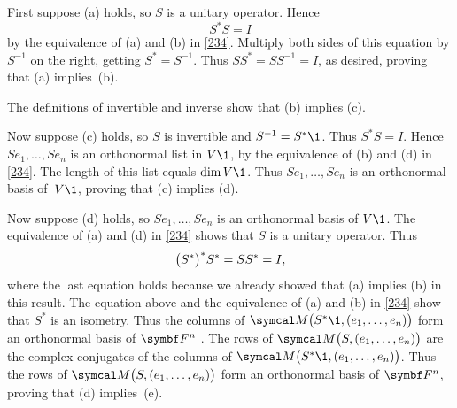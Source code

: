 
\proof
First suppose (a) holds, so $S$ is a unitary operator. Hence
\[
S^*S = I
\]
by the equivalence of (a) and (b) in \ref{234}. Multiply both sides of this equation by $S^{-1}$ on the right, getting $S^* = S^{-1}$. Thus $SS^* = SS^{-1} = I$, as desired, proving that (a) implies~(b).

The definitions of invertible and inverse show that (b) implies (c).

Now suppose (c) holds, so $S$ is invertible and $S^{-1} = S^*\1$. Thus $S^*S = I$. Hence $Se_1, \ldots, Se_n$ is an orthonormal list in $V\1$, by the equivalence of (b) and (d) in \ref{234}. The length of this list equals $\dim V\1$. Thus $Se_1, \dots, Se_n$ is an orthonormal basis of~$V\1$, proving that (c) implies (d).

Now suppose (d) holds, so $Se_1, \dots, Se_n$ is an orthonormal basis of $V\1$. The equivalence of (a) and (d) in \ref{234} shows that $S$ is a unitary operator. Thus
\[
\paren[\big]{S^*}^* S^* = SS^* = I,
\]
where the last equation holds because we already showed that (a) implies (b) in this result. The equation above and the equivalence of (a) and (b) in \ref{234} show that $S^*$ is an isometry. Thus the columns of $\M\paren[\big]{S^*\1, (e_1, \ldots, e_n)}$ form an orthonormal basis of $\F{n}$ . The rows of $\M\paren[\big]{S, (e_1, \ldots, e_n)}$ are the complex conjugates of the columns of $\M\paren[\big]{S^*\1, (e_1, \ldots, e_n)}$. Thus the rows of $\M\paren[\big]{S, (e_1, \ldots, e_n)}$ form an orthonormal basis of $\F{n}$, proving that (d) implies~(e).

